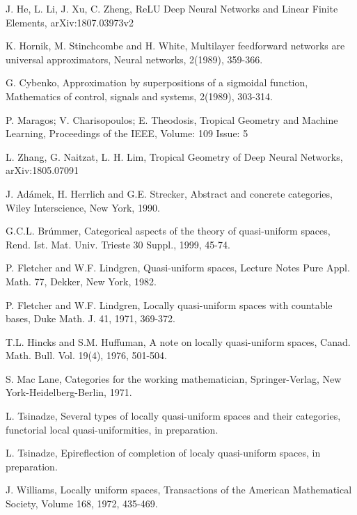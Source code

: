 \documentclass{beamer}
\begin{document}
\begin{thebibliography}{...}
     J. He, L. Li, J. Xu, C. Zheng, ReLU Deep Neural Networks and Linear Finite Elements,
    arXiv:1807.03973v2

     K. Hornik, M. Stinchcombe and H. White, Multilayer feedforward networks are
    universal approximators, Neural networks, 2(1989), 359-366.

     G. Cybenko, Approximation by superpositions of a sigmoidal function, 
    Mathematics of control, signals and systems, 2(1989), 303-314.

     P. Maragos; V. Charisopoulos; E. Theodosis, Tropical Geometry and Machine Learning,
    Proceedings of the IEEE, Volume: 109 Issue: 5

     L. Zhang, G. Naitzat, L. H. Lim, Tropical Geometry of Deep Neural Networks,
    arXiv:1805.07091

     J. Ad\'amek, H. Herrlich and G.E. Strecker, Abstract and concrete
    categories,
    Wiley Interscience, New York, 1990.
    
     G.C.L. Br\'ummer, Categorical aspects of the theory of
    quasi-uniform spaces, Rend. Ist. Mat. Univ. Trieste 30 Suppl., 1999,
    45-74.
    
     P. Fletcher and W.F. Lindgren, Quasi-uniform spaces, Lecture
    Notes Pure Appl. Math. 77, Dekker, New York, 1982.
    
     P. Fletcher and W.F. Lindgren, Locally quasi-uniform spaces with
    countable bases, Duke Math. J. 41, 1971, 369-372.
    
     T.L. Hincks and S.M. Huffuman, A note on locally quasi-uniform
    spaces, Canad. Math. Bull. Vol. 19(4), 1976, 501-504.
    
     S. Mac Lane, Categories for the working mathematician,
    Springer-Verlag, New York-Heidelberg-Berlin, 1971.
    
     L. Tsinadze, Several types of locally quasi-uniform spaces and their
    categories, functorial local quasi-uniformities, in preparation.
    
     L. Tsinadze, Epireflection of completion of 
    localy quasi-uniform spaces, in preparation.
    
     J. Williams, Locally uniform spaces, Transactions of the American
    Mathematical Society, Volume 168, 1972, 435-469.
    

\end{thebibliography}
\end{document}
